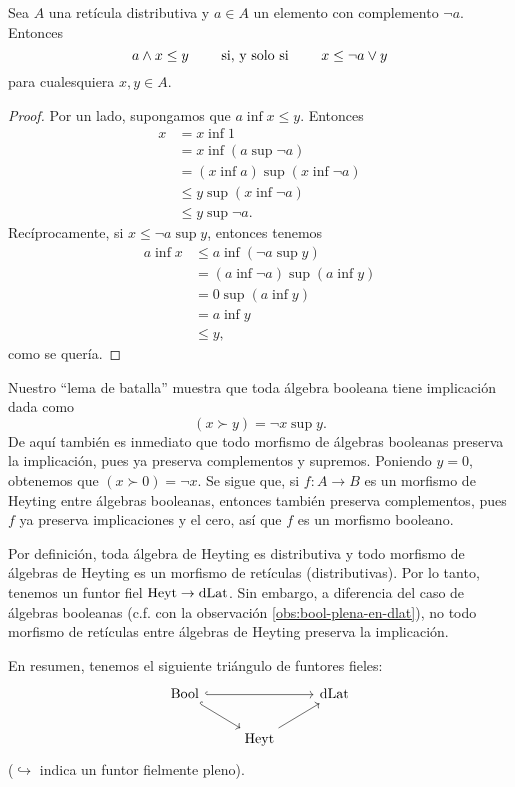 \begin{lemma}\label{lemma:caballo}
    Sea $A$ una retícula distributiva
    y $a\in A$ un elemento con complemento $\neg a$.
    Entonces
    \[
        a\wedge x \leq y  \qquad\text{ si, y solo si }\qquad x\leq \neg a\vee y
    \]
    para cualesquiera $x,y\in A$.
\end{lemma}
\begin{proof}
    Por un lado, supongamos que $a\inf x\leq y$.
    Entonces
    \begin{align*}
        x
        &= x \inf 1 \\
        &= x \inf (a\sup \neg a) \\
        &= (x\inf a)\sup(x\inf\neg a) \\
        &\leq y \sup (x\inf \neg a) \\
        &\leq y \sup \neg a.
    \end{align*}
    Recíprocamente, si $x\leq \neg a\sup y$, entonces tenemos
    \begin{align*}
        a\inf x
        &\leq a\inf(\neg a\sup y) \\
        &= (a\inf\neg a) \sup (a\inf y) \\
        &= 0\sup (a\inf y) \\
        &= a\inf y \\
        &\leq y,
    \end{align*}
    como se quería.
\end{proof}

Nuestro ``lema de batalla'' muestra que toda álgebra booleana tiene
implicación dada como \[(x\succ y)=\neg x\sup y.\] De aquí también es
inmediato que todo morfismo de álgebras booleanas preserva
la implicación, pues ya preserva complementos y supremos.
Poniendo $y=0$, obtenemos que $(x\succ 0)=\neg x$.
Se sigue que, si $f\colon A\rightarrow B$ es un morfismo de Heyting entre
álgebras booleanas, entonces también preserva complementos, pues $f$
ya preserva implicaciones y el cero, así que $f$ es un morfismo
booleano.

Por definición, toda álgebra de Heyting es distributiva y todo
morfismo de álgebras de Heyting es un morfismo de retículas
(distributivas). Por lo tanto, tenemos un funtor fiel $\mathrm{Heyt}\to\mathrm{dLat}$.
Sin embargo, a diferencia del caso de álgebras booleanas (c.f. con la
observación \ref{obs:bool-plena-en-dlat}), no todo morfismo de
retículas entre álgebras de Heyting preserva la implicación.

En resumen, tenemos el siguiente triángulo de funtores fieles:
\begin{equation} \label{diag:bool-heyt-dlat}
\begin{tikzcd}
  \Bool \ar[dr,hook] \ar[rr,hook] &               & \DLat \\
                                  & \Heyt \ar[ur]
\end{tikzcd}
\end{equation}
($\hookrightarrow$ indica un funtor fielmente pleno).

